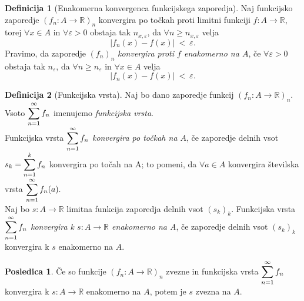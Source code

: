 \documentclass[11pt]{article}
\theoremstyle{definition}
\newtheorem{definicija}{Definicija}[section]
\theoremstyle{definition}
\theoremstyle{definition}
\theoremstyle{theorem}
\newtheorem*{posledica}{Posledica}
\begin{document}
\begin{definicija}[Enakomerna konvergenca funkcijskega zaporedja]

Naj \hbox{funkcijsko} zaporedje $(f_n: A \rightarrow \mathbb{R})_n$ konvergira po točkah proti limitni funkciji \hbox{$f: A \rightarrow \mathbb{R}$}, torej $\forall x \in A$ in $\forall \varepsilon > 0$ obstaja tak $n_{x,\varepsilon}$, da $\forall n \geq n_{x,\varepsilon}$ velja 
$$|f_n(x) - f(x)| ~<~ \varepsilon.$$
Pravimo, da zaporedje $(f_n)_n$ \textit{konvergira proti $f$ enakomerno na $A$}, če $\forall  \varepsilon > 0$ obstaja tak $n_{\varepsilon}$, da $\forall n \geq n_{\varepsilon}$ in $\forall x \in A$ velja
$$|f_n(x) - f(x)| ~<~ \varepsilon.$$

\end{definicija}
\vspace{0.5cm}

\begin{definicija}[Funkcijska vrsta]

Naj bo dano zaporedje funkcij \hbox{$(f_n: A \rightarrow \mathbb{R})_n$}. Vsoto $\mathlarger{\sum_{n=1}^{\infty} f_n}$ imenujemo \textit{funkcijska vrsta}. \\

Funkcijska vrsta $\mathlarger{\sum_{n=1}^{\infty} f_n}$ \textit{konvergira po točkah na $A$}, če zaporedje delnih vsot $s_k = \mathlarger{\sum_{n=1}^{k} f_n}$ konvergira po točah na A; to pomeni, da $\forall a \in A$ konvergira številska vrsta $\mathlarger{\sum_{n=1}^{\infty} f_n(a)}.$ \\

Naj bo $s: A \rightarrow \mathbb{R}$ limitna funkcija zaporedja delnih vsot $(s_k)_k$. \hbox{Funkcijska} vrsta $\mathlarger{\sum_{n=1}^{\infty}f_n}$ \textit{konvergira k $s: A \rightarrow \mathbb{R}$ enakomerno na A}, če zaporedje delnih vsot $(s_k)_k$ konvergira k $s$ enakomerno na $A$.
 

\end{definicija}
\vspace{0.5cm}

\begin{posledica}

Če so funkcije $(f_n: A \rightarrow \mathbb{R})_n$ zvezne in funkcijska vrsta $\mathlarger{\sum_{n=1}^{\infty} f_n}$ konvergira k $s: A \rightarrow \mathbb{R}$ enakomerno na $A$, potem je $s$ zvezna na $A$.

\end{posledica}
\vspace{0.5cm}
\end{document}
